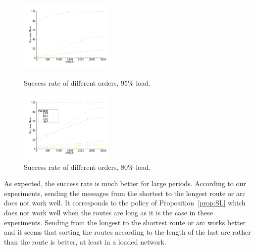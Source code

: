 \documentclass[10pt, conference, letterpaper]{IEEEtran}
\begin{document}
\begin{figure}[] 

\begin{minipage}[c]{0.2\textwidth}

      \includegraphics[width=4.5cm]{departs_gp_21000.pdf}
      \caption{Success rate of different orders, $95\%$ load.}
    
      \end{minipage} \hfill
        \begin{minipage}[c]{0.2\textwidth}
          \includegraphics[width=4.5cm]{departs_gp_25000.pdf}
     \caption{Success rate of different orders, $80\%$ load.}
            \end{minipage} \hfill
                  \label{fig:success30000}
     \end{figure}
%
% 
%  
     
     As expected, the  success rate is much better for large periods. According to our experiments, sending the messages from the shortest to the longest route or arc does not work well. It corresponds to the policy of Proposition~\ref{prop:SL} which does not work well when the routes are long as it is the case in these experiments. Sending from the longest to the shortest route or arc works better and it seems that sorting the routes according to the length of the last arc rather than the route is better, at least in a loaded network. 
     
\end{document}
